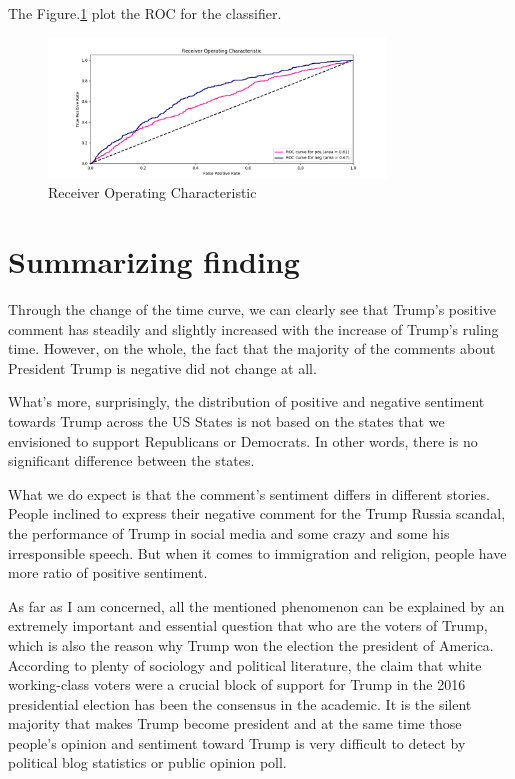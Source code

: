\documentclass[12pt]{article}
\begin{document}
The Figure.\ref{fig:7} plot the ROC for the classifier.
\begin{figure}[!h]
     \begin{center}
                  \includegraphics[width=0.8\textwidth]{../plots/part7.png}
    \end{center}
    \caption{%
       Receiver Operating Characteristic
     }%
   \label{fig:7}
\end{figure}

\section {Summarizing finding}

Through the change of the time curve, we can clearly see that Trump's positive comment has steadily and slightly increased with the increase of Trump's ruling time. However, on the whole, the fact that the majority of the comments about President Trump is negative did not change at all.

What's more, surprisingly, the distribution of positive and negative sentiment towards Trump across the US States is not based on the states that we envisioned to support Republicans or Democrats. In other words, there is no significant difference between the states.

What we do expect is that the comment's sentiment differs in different stories. People inclined to express their negative comment for the Trump Russia scandal, the performance of Trump in social media and some crazy and some his irresponsible speech. But when it comes to immigration and religion, people have more ratio of positive sentiment.

As far as I am concerned, all the mentioned phenomenon can be explained by an extremely important and essential question that who are the voters of Trump, which is also the reason why Trump won the election the president of America. According to plenty of sociology and political literature, the claim that white working-class voters were a crucial block of support for Trump in the 2016 presidential election has been the consensus in the academic. It is the silent majority that makes Trump become president and at the same time those people's opinion and sentiment toward Trump is very difficult to detect by political blog statistics or public opinion poll.
\newpage
\end{document}
